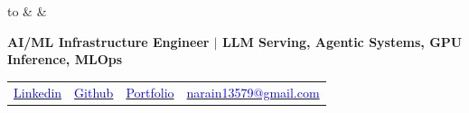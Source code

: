 \documentclass[10pt,a4]{article}
\begin{document}
{\selectfont
	\renewcommand{\familydefault}{\sfdefault}

	\noindent
	\begin{tabu} to \textwidth {X[1] X[c] X[r]}
		  &    &   		\\
	\end{tabu}

    \vspace{-1mm}
    \begin{center}\small
        \textbf{AI/ML Infrastructure Engineer $|$ LLM Serving, Agentic Systems, GPU Inference, MLOps}
    \end{center}

    \vspace{-3mm}



    \begin{center}
    \begin{tabular} {p{} p{} p{} p{}}
        \raggedright\href{https://www.linkedin.com/in/narainp}{\textcolor{blue}{Linkedin}} &
        \href{https://github.com/narain1}{\textcolor{blue}{Github}} &
        \href{https://about.narain.dev/}{\textcolor{blue}{Portfolio}} &
        \raggedright\href{mailto:narain13579@gmail.com}{\textcolor{blue}{narain13579@gmail.com}}
    \end{tabular}
    \end{center}

}
\end{document}
